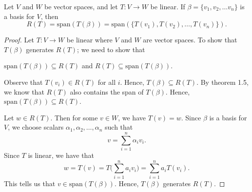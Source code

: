\begin{theorem}\label{Spanning set for R(T)}
    Let \( V  \) and \( W  \) be vector spaces, and let \( T:V \to W  \) be linear. If \( \beta = \{ v_{1}, v_{2}, \dots v_{n} \}  \) is a basis for \( V  \), then   
    \[  R(T) = \text{span}(T(\beta)) = \text{span}(\{ T(v_{1}), T(v_{2}) , \dots, T(v_{n}) \} ). \]
\end{theorem}

\begin{proof}
Let \( T: V \to W  \) be linear where \( V  \) and \( W  \) are vector spaces. To show that \( T(\beta) \) generates \( R(T) \); we need to show that  
\begin{center}
    \( \text{span}(T(\beta)) \subseteq R(T) \) and \( R(T) \subseteq \text{span}(T(\beta)) \).
\end{center}
    Observe that \( T(v_{i}) \in R(T) \) for all \( i  \). Hence, \( T(\beta) \subseteq R(T) \). By theorem 1.5, we know that \( R(T) \) also contains the span of \( T(\beta) \). Hence, \( \text{span}(T(\beta)) \subseteq R(T) \). 

    Let \( w \in R(T) \). Then for some \( v \in W  \), we have \( T(v) = w \). Since \( \beta \) is a basis for \( V  \), we choose scalars \( \alpha_{1}, \alpha_{2}, \dots, \alpha_{n} \) such that 
    \[  v  = \sum_{ i=1 }^{ n } \alpha_{i} v_{i}. \]
    Since \( T  \) is linear, we have that
    \[  w = T(v) = T \Big( \sum_{ i=1 }^{ n } a_{i} v_{i} \Big) = \sum_{ i=1 }^{ n } a_{i} T(v_{i}). \]
    This tells us that \( v \in \text{span}(T(\beta)) \). Hence, \( T(\beta) \) generates \( R(T) \).
\end{proof}


